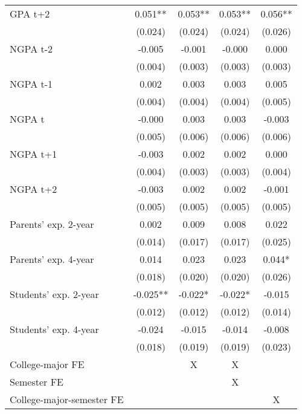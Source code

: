 {{\begin{tabular}{lcccc}
GPA t+2             &       0.051** &       0.053** &       0.053** &       0.056** \\
                    &     (0.024)   &     (0.024)   &     (0.024)   &     (0.026)   \\
 
NGPA t-2            &      -0.005   &      -0.001   &      -0.000   &       0.000   \\
                    &     (0.004)   &     (0.003)   &     (0.003)   &     (0.003)   \\
 
NGPA t-1            &       0.002   &       0.003   &       0.003   &       0.005   \\
                    &     (0.004)   &     (0.004)   &     (0.004)   &     (0.005)   \\
 
NGPA t              &      -0.000   &       0.003   &       0.003   &      -0.003   \\
                    &     (0.005)   &     (0.006)   &     (0.006)   &     (0.006)   \\
 
NGPA t+1            &      -0.003   &       0.002   &       0.002   &       0.000   \\
                    &     (0.004)   &     (0.003)   &     (0.003)   &     (0.004)   \\
 
NGPA t+2            &      -0.003   &       0.002   &       0.002   &      -0.001   \\
                    &     (0.005)   &     (0.005)   &     (0.005)   &     (0.005)   \\
 
Parents' exp. 2-year&       0.002   &       0.009   &       0.008   &       0.022   \\
                    &     (0.014)   &     (0.017)   &     (0.017)   &     (0.025)   \\
 
Parents' exp. 4-year&       0.014   &       0.023   &       0.023   &       0.044*  \\
                    &     (0.018)   &     (0.020)   &     (0.020)   &     (0.026)   \\
 
Students' exp. 2-year&      -0.025** &      -0.022*  &      -0.022*  &      -0.015   \\
                    &     (0.012)   &     (0.012)   &     (0.012)   &     (0.014)   \\
 
Students' exp. 4-year&      -0.024   &      -0.015   &      -0.014   &      -0.008   \\
                    &     (0.018)   &     (0.019)   &     (0.019)   &     (0.023)   \\
 
 College-major FE                      &  & X & X &  \\
 Semester FE                           &  &   & X &  \\
 College-major-semester FE &  &   &   & X \\

\bottomrule
\end{tabular}
}
}
